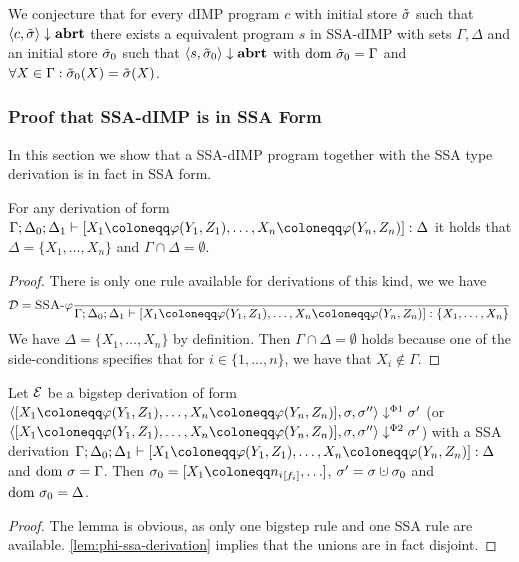 \begin{conjecture}
    We conjecture that for every dIMP program $c$ with initial store $\tilde{\sigma}$
    such that $\langle c, \tilde{\sigma} \rangle \downarrow \textbf{abrt}$ there exists a equivalent program
    $s$ in SSA-dIMP with sets $\Gamma, \Delta$ and an initial store $\tilde{\sigma}_0$ such that
     $\langle s, \tilde{\sigma}_0 \rangle \downarrow \textbf{abrt}$ with
    $\text{dom }{\tilde{\sigma}_0} = \Gamma$ and $\forall X \in \Gamma: \tilde{\sigma}_0(X) = \tilde{\sigma}(X)$.
\end{conjecture}
\subsubsection*{Proof that SSA-dIMP is in SSA Form}
In this section we show that a SSA-dIMP program together with the SSA type derivation
is in fact in SSA form.
\begin{lemma}
    \label{lem:phi-ssa-derivation}
    For any derivation of form $\typestep{\Gamma;\Delta_0;\Delta_1}{\defaultphilistn}{\Delta}$
    it holds that $\Delta = \{X_1, \ldots, X_n\}$ and $\Gamma \cap \Delta = \emptyset$.
\end{lemma}
\begin{proof}
    There is only one rule available for derivations of this kind, we we have
    \begin{align*}
        \D = \rule{SSA-$\varphi$}{}{\typestep{\Gamma;\Delta_0;\Delta_1}{\defaultphilistn}{\{X_1, \ldots, X_n\}}}
    \end{align*}
    We have $\Delta = \{X_1, \ldots, X_n\}$ by definition.
    Then $\Gamma \cap \Delta = \emptyset$ holds because one of the side-conditions
    specifies that for $i \in \{1, \ldots, n\}$, we have that $X_i \notin \Gamma$.
\end{proof}

\begin{lemma}
    \label{lem:phi-bs-derivation}
    Let $\operatorname{\mathcal{E}}$ be a bigstep derivation of form $\bigsteppl{\defaultphilistn}{\store}{\store''}{\store'}$
    (or $\bigsteppr{\defaultphilistn}{\store}{\store''}{\store'}$)
    with a SSA derivation $\typestep{\Gamma;\Delta_0;\Delta_1}{\defaultphilistn}{\Delta}$
    and $\text{dom }{\sigma} = \Gamma$.
    Then $\store_0 = [X_1 \coloneqq \flagged[n_i][i], \ldots]$, $\store' = \store \dunion \store_0$
    and $\text{dom }{\sigma_0} = \Delta$.
\end{lemma}
\begin{proof}
    The lemma is obvious, as only one bigstep rule and one SSA rule are available.
    \autoref{lem:phi-ssa-derivation} implies that the unions are in fact disjoint.
\end{proof}

